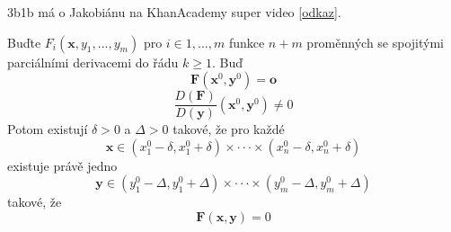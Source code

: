 \documentclass[../main.tex]{subfiles}
\begin{document}
\begin{remark}
	3b1b má o Jakobiánu na KhanAcademy super video [\href{https://www.khanacademy.org/math/multivariable-calculus/multivariable-derivatives/jacobian/v/the-jacobian-matrix}{odkaz}].
\end{remark}

\begin{theorem}
	Buďte $F_i(\mathbf{x}, y_1, ... , y_m)$ pro $i \in {1, ... , m}$ funkce $n+m$ proměnných se spojitými
	parciálními derivacemi do řádu $k \geq 1$. Buď \[ \mathbf{F}(\mathbf{x}^0, \mathbf{y}^0) = \mathbf{o} \]
	\[ \frac{D(\mathbf{F})}{D(\mathbf{y})}(\mathbf{x}^0, \mathbf{y}^0) \neq 0 \]
	Potom existují $\delta > 0$ a $\Delta > 0$ takové, že pro každé
	\[ \mathbf{x} \in (x_{1}^{0} - \delta, x_{1}^{0} + \delta) \times \cdot \cdot \cdot \times 
	(x_{n}^{0} - \delta, x_{n}^{0} + \delta)\]
	existuje právě jedno
	\[ \mathbf{y} \in (y_{1}^{0} - \Delta , y_{1}^{0} + \Delta) \times \cdot \cdot \cdot \times
	(y_{m}^{0} - \Delta , y_{m}^{0} + \Delta) \]
	takové, že
	\[ \mathbf{F}(\mathbf{x}, \mathbf{y}) = 0 \]
\end{theorem}
\end{document}
